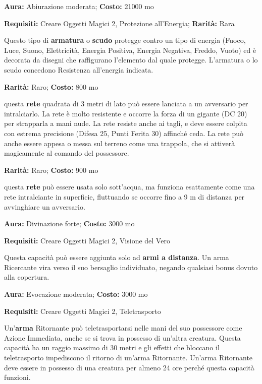 \begin{multicols}{2}

\textbf{Aura:} Abiurazione moderata; \textbf{Costo:} 21000 mo

\textbf{Requisiti:} Creare Oggetti Magici 2, Protezione all'Energia; \textbf{Rarità:} Rara

Questo tipo di \textbf{armatura} o \textbf{scudo} protegge contro un tipo di energia (Fuoco, Luce, Suono, Elettricità, Energia Positiva, Energia Negativa, Freddo, Vuoto) ed è decorata da disegni che raffigurano l'elemento dal quale protegge. L'armatura o lo scudo concedono Resistenza all'energia indicata.


\textbf{Rarità:} Raro; \textbf{Costo:} 800 mo

questa \textbf{rete} quadrata di 3 metri di lato può essere lanciata a un avversario per intralciarlo. La rete è molto resistente e occorre la forza di un gigante (DC 20) per strapparla a mani nude. La rete resiste anche ai tagli, e deve essere colpita con estrema precisione (Difesa 25, Punti Ferita 30) affinché ceda. La rete può anche essere appesa o messa sul terreno come una trappola, che si attiverà magicamente al comando del possessore.


\textbf{Rarità:} Raro; \textbf{Costo:} 900 mo

questa \textbf{rete} può essere usata solo sott'acqua, ma funziona esattamente come una rete intralciante in superficie, fluttuando se occorre fino a 9 m di distanza per avvinghiare un avversario.


\textbf{Aura:} Divinazione forte; \textbf{Costo:} 3000 mo

\textbf{Requisiti:} Creare Oggetti Magici 2, Visione del Vero

Questa capacità può essere aggiunta solo ad \textbf{armi a distanza}. Un arma Ricercante vira verso il suo bersaglio individuato, negando qualsiasi bonus dovuto alla copertura.


\textbf{Aura:} Evocazione moderata; \textbf{Costo:} 3000 mo

\textbf{Requisiti:} Creare Oggetti Magici 2, Teletrasporto

Un'\textbf{arma} Ritornante può teletrasportarsi nelle mani del suo possessore come Azione Immediata, anche se si trova in possesso di un'altra creatura. Questa capacità ha un raggio massimo di 30 metri e gli effetti che bloccano il teletrasporto impediscono il ritorno di un'arma Ritornante. Un'arma Ritornante deve essere in possesso di una creatura per almeno 24 ore perché questa capacità funzioni.


\end{multicols}
